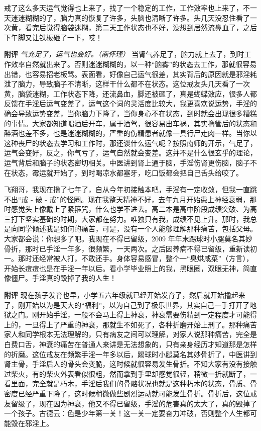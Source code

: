 \begin{case}
    戒了这么多天运气觉得也上来了，找了一个稳定的工作，工作效率也上来了，不一天迷迷糊糊的了，脑力真的恢复了许多，头脑也清晰了许多。头几天没忍住看了一次黄，看完后觉得脑袋迷糊，第二天工作状态也不好，没想到居然流鼻血了，之后下午脚又让铁板砸了一下，哎！

    \textbf{附评} \textit{气充足了，运气也会好。（南怀瑾）} 当肾气养足了，脑力就上去了，到时工作效率自然就出来了。否则迷迷糊糊的，以一种“脑雾”的状态去工作，那就很容易出错，也容易招老板骂。表面看，好像自己运气很差，其实背后的原因就是邪淫耗泄了脑力，导致脑子不清晰，这样干什么都不在状态。这位戒友头几天看了一次黄，脑袋迷糊，工作状态下降，还流鼻血，脚还被砸了，真是蝴蝶效应，很多人都反馈在手淫后运气变差了，运气这个词的灵活度比较大，我更喜欢说运势，手淫的确会导致运势变差，当你脑力下降了，当你身心不在状态，到时就会出现很多糟糕的事情。大家都知道喝酒后开车，属于酒驾，很容易出车祸，其实撸管后的状态和醉酒也差不多，也是迷迷糊糊的，严重的伤精患者就像一具行尸走肉一样。当你以这种丧尸的状态去学习和工作时，那还谈什么运气呢？按照南师的开示，气足了，运气会变好，反之，你气亏了，运气自然就会变差。这并不是什么很玄乎的理论，运气背后和脑子的状态密切相关。中医讲到肾上通于脑，手淫伤肾更伤脑，脑子不在状态，霉运就开始了，到时喝凉水都塞牙，吃口饭都会把自己舌头给咬了。
\end{case}

\begin{case}
    飞翔哥，我现在撸了七年了，自从今年初接触本吧，手淫有一定收敛，但我一直跳不出“戒 - 破 - 戒”的怪圈。现在我整天精神不好，去年九月开始患上神经衰弱，那时感觉头上像戴上了紧箍咒，什么也学不进去。高二本是高中阶段成绩突破、为高三打下坚实基础的时期，大家都在努力。唯独只有我，成绩不见上升。那时，我总是向同学倾述我是如何的痛苦，可是，没有一个人能够理解那种痛苦，包括父母。大家都会说：你想多了吧。我现在不得已留级，2009 年年末踢球时小腿莫名其妙骨折，那时已手淫一年多，很频繁，一天两次。之后因养病不得已留级，重新读初一。那时还经常被人打，不敢还手。身体容易感冒，整个一“臭烘咸菜”（方言），开始长痘痘也是在手淫一年以后。看小学毕业照上的我，黑眼圈，双眼无神，简直像僵尸。手淫真的毁掉了我的人生！

    \textbf{附评} 现在孩子发育也早，小学五六年级就已经开始发育了，然后就开始撸起来了，刚开始以为是天大的“福利”，以为自己到了极乐世界，其实自己一手打开了地狱之门。刚开始手淫，一般不会马上得上神衰，神衰需要伤精到一定程度才可能得上的，一旦得上了严重的神衰，那就生不如死了，各种折磨开始上刑了。那种痛苦家人和同学根本无法理解的，只有病友之间可以理解，对家人说那种痛苦，完全是白费口舌，神衰的痛苦在普通人来讲是无法想象的，只有亲身经历才知道那是怎样的折磨。这位戒友在频繁手淫一年多以后，踢球时小腿莫名其妙骨折了，中医讲到肾主骨，手淫后人的骨头会变脆，这时候就很容易发生骨折。不知大家有没有接触过柴火，有的柴火外表看似很粗，然而拿到手里却感觉很轻，稍微一折就断了，一看里面，完全就是朽木，手淫后我们的骨骼状况也就是这种朽木的状态，骨质、骨密度已经严重下降了，这时候稍微做些剧烈运动就可能发生骨折。骨折后，这位戒友留级了，现在因为神衰，他又不得已留级，手淫的危害真的太大了，真的毁掉了一个孩子。古德云：色是少年第一关！这一关一定要奋力冲破，否则整个人生都可能毁在邪淫上。
\end{case}

